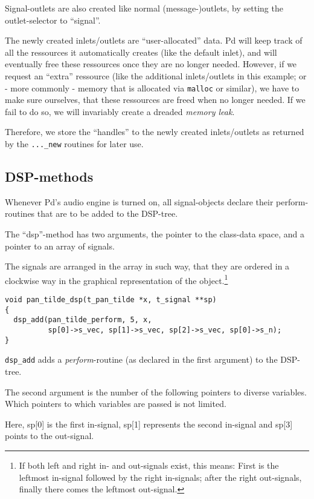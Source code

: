\documentclass[12pt, a4paper,english,titlepage]{article}
\begin{document}
Signal-outlets are also created like normal (message-)outlets,
by setting the outlet-selector to ``signal''.

The newly created inlets/outlets are ``user-allocated'' data.
Pd will keep track of all the ressources it automatically creates (like the default inlet),
and will eventually free these ressources once they are no longer needed.
However, if we request an ``extra'' ressource (like the additional inlets/outlets in this example;
or - more commonly - memory that is allocated via \verb+malloc+ or similar),
we have to make sure ourselves, that these ressources are freed when no longer needed.
If we fail to do so, we will invariably create a dreaded {\em memory leak}.

Therefore, we store the ``handles'' to the newly created inlets/outlets as returned by the \verb+..._new+ routines
for later use.


\subsection{DSP-methods}
Whenever Pd's audio engine is turned on,
all signal-objects declare their perform-routines that are to be added to the DSP-tree.

The ``dsp''-method has two arguments, the pointer to the class-data space, and 
a pointer to an array of signals.

The signals are arranged in the array in such way,
that they are ordered in a clockwise way in the graphical representation of the
object.\footnote{
If both left and right in- and out-signals exist, this means:
First is the leftmost in-signal followed by the right in-signals;
after the right out-signals, finally there comes the leftmost out-signal.}

\begin{verbatim}
void pan_tilde_dsp(t_pan_tilde *x, t_signal **sp)
{
  dsp_add(pan_tilde_perform, 5, x,
          sp[0]->s_vec, sp[1]->s_vec, sp[2]->s_vec, sp[0]->s_n);
}
\end{verbatim}

\verb+dsp_add+ adds a {\em perform}-routine (as declared in the first argument)
to the DSP-tree.

The second argument is the number of the following pointers to diverse variables.
Which pointers to which variables are passed is not limited.

Here, sp[0] is the first in-signal, sp[1] represents the second in-signal and
sp[3] points to the out-signal.
\end{document}
